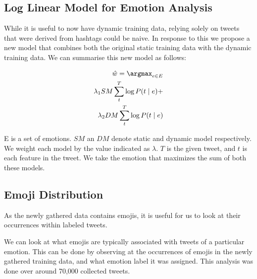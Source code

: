 \subsection{Log Linear Model for Emotion Analysis} \label{log_model}

While it is useful to now have dynamic training data, relying solely on tweets that were derived from hashtags could be naive. In response to this we propose a new model that combines both the original static training data with the dynamic training data. We can summarise this new model as follows:

\begin{equation}
\begin{split}
\hat{w} = \argmax_{e \in E} \\ \lambda_1 SM \sum_{t}^{T} \log P(t \mid e)  + \\ \lambda_2 DM \sum_{t}^{T} \log P(t \mid e)
\end{split}
\end{equation}

E is a set of emotions. $SM$ an $DM$ denote static and dynamic model respectively. We weight each model by the value indicated as $\lambda$. $T$ is the given tweet, and $t$ is each feature in the tweet. We take the emotion that maximizes the sum of both these models.

\subsection{Emoji Distribution} \label{em_dist}

As the newly gathered data contains emojis, it is useful for us to look at their occurrences within labeled tweets.

We can look at what emojis are typically associated with tweets of a particular emotion. This can be done by observing at the occurrences of emojis in the newly gathered training data, and what emotion label it was assigned. This analysis was done over around 70,000 collected tweets. 

